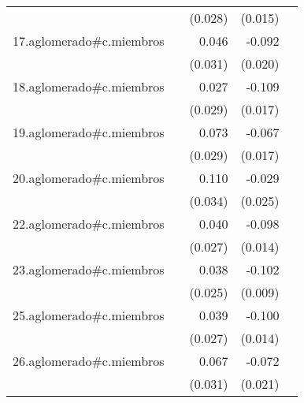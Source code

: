 {\begin{longtable}{l*{4}{D{.}{.}{-1}}}
            &                     &     (0.028)         &     (0.015)         &                     \\
\addlinespace
17.aglomerado#c.miembros&                     &       0.046         &      -0.092\sym{***}&                     \\
            &                     &     (0.031)         &     (0.020)         &                     \\
\addlinespace
18.aglomerado#c.miembros&                     &       0.027         &      -0.109\sym{***}&                     \\
            &                     &     (0.029)         &     (0.017)         &                     \\
\addlinespace
19.aglomerado#c.miembros&                     &       0.073\sym{*}  &      -0.067\sym{***}&                     \\
            &                     &     (0.029)         &     (0.017)         &                     \\
\addlinespace
20.aglomerado#c.miembros&                     &       0.110\sym{**} &      -0.029         &                     \\
            &                     &     (0.034)         &     (0.025)         &                     \\
\addlinespace
22.aglomerado#c.miembros&                     &       0.040         &      -0.098\sym{***}&                     \\
            &                     &     (0.027)         &     (0.014)         &                     \\
\addlinespace
23.aglomerado#c.miembros&                     &       0.038         &      -0.102\sym{***}&                     \\
            &                     &     (0.025)         &     (0.009)         &                     \\
\addlinespace
25.aglomerado#c.miembros&                     &       0.039         &      -0.100\sym{***}&                     \\
            &                     &     (0.027)         &     (0.014)         &                     \\
\addlinespace
26.aglomerado#c.miembros&                     &       0.067\sym{*}  &      -0.072\sym{***}&                     \\
            &                     &     (0.031)         &     (0.021)         &                     \\

\end{longtable}}
